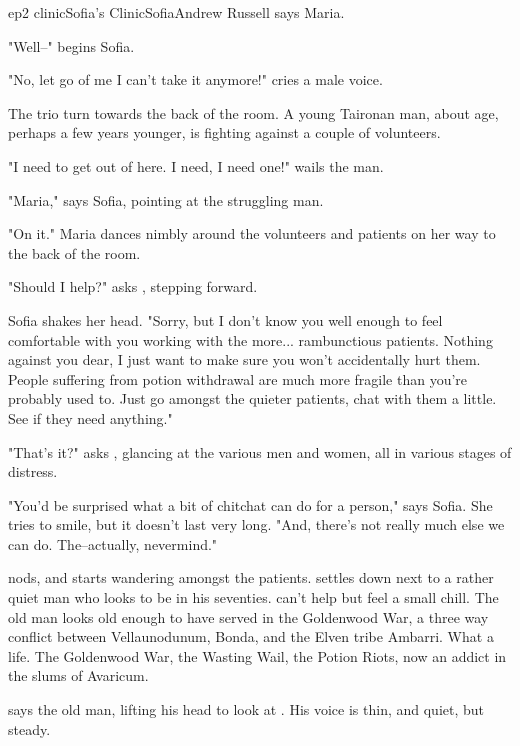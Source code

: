 \documentclass{book}
\begin{document}
\begin{node}{ep2 clinic}{Sofia's Clinic}{Sofia}{Andrew Russell}
     says Maria.

    "Well--" begins Sofia.

    "No, let go of me I can't take it anymore!" cries a male voice.

    The trio turn towards the back of the room. A young Taironan man, about \names{} age, perhaps a few years younger, is fighting against a couple of volunteers.

    "I need to get out of here. I need, I need one!" wails the man.

    "Maria," says Sofia, pointing at the struggling man.

    "On it." Maria dances nimbly around the volunteers and patients on her way to the back of the room.

    "Should I help?" asks \name{}, stepping forward.

    Sofia shakes her head. "Sorry, but I don't know you well enough to feel comfortable with you working with the more... rambunctious patients. Nothing against you dear, I just want to make sure you won't accidentally hurt them. People suffering from potion
    withdrawal are much more fragile than you're probably used to. Just go amongst the quieter patients, chat with them a little. See if they need anything."

    "That's it?" asks \name{}, glancing at the various men and women, all in various stages of distress.

    "You'd be surprised what a bit of chitchat can do for a person," says Sofia. She tries to smile, but it doesn't last very long. "And, there's not really much else we can do. The--actually, nevermind."

    \name{} nods, and starts wandering amongst the patients. \HeShe{} settles down next to a rather quiet man who looks to be in his seventies. \name{} can't help but feel a small chill. The old man 
    looks old enough to
    have served in the Goldenwood War, a three way conflict between Vellaunodunum, Bonda, and the Elven tribe Ambarri. What a life. The Goldenwood War, the Wasting Wail, the Potion Riots, now an 
    addict in the slums of Avaricum.
    
     says the old man, lifting his head to look at \name{}. His voice is thin, and quiet, but steady.


\end{node}
\end{document}
